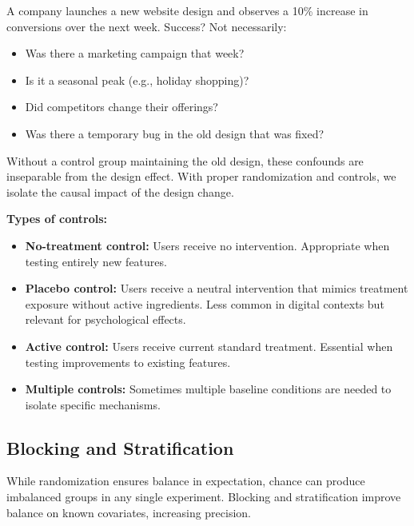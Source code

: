 \begin{example}
A company launches a new website design and observes a 10\% increase in conversions over the next week. Success? Not necessarily:

\begin{itemize}
    \item Was there a marketing campaign that week?
    \item Is it a seasonal peak (e.g., holiday shopping)?
    \item Did competitors change their offerings?
    \item Was there a temporary bug in the old design that was fixed?
\end{itemize}

Without a control group maintaining the old design, these confounds are inseparable from the design effect. With proper randomization and controls, we isolate the causal impact of the design change.
\end{example}

\textbf{Types of controls:}

\begin{itemize}
    \item \textbf{No-treatment control:} Users receive no intervention. Appropriate when testing entirely new features.

    \item \textbf{Placebo control:} Users receive a neutral intervention that mimics treatment exposure without active ingredients. Less common in digital contexts but relevant for psychological effects.

    \item \textbf{Active control:} Users receive current standard treatment. Essential when testing improvements to existing features.

    \item \textbf{Multiple controls:} Sometimes multiple baseline conditions are needed to isolate specific mechanisms.
\end{itemize}

\subsection{Blocking and Stratification}

While randomization ensures balance in expectation, chance can produce imbalanced groups in any single experiment. Blocking and stratification improve balance on known covariates, increasing precision.


